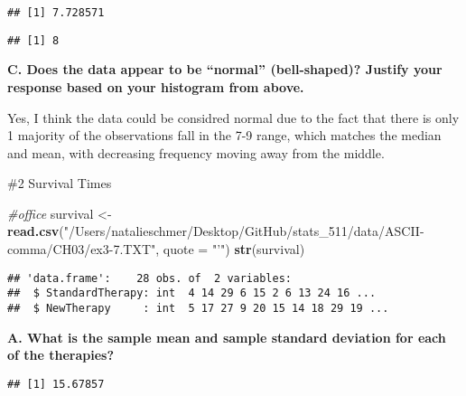 \documentclass[]{article}
\newenvironment{Shaded}{\begin{snugshade}}{\end{snugshade}}
\newcommand{\CommentTok}[1]{\textcolor[rgb]{0.56,0.35,0.01}{\textit{#1}}}
\newcommand{\DataTypeTok}[1]{\textcolor[rgb]{0.13,0.29,0.53}{#1}}
\newcommand{\KeywordTok}[1]{\textcolor[rgb]{0.13,0.29,0.53}{\textbf{#1}}}
\newcommand{\NormalTok}[1]{#1}
\newcommand{\OperatorTok}[1]{\textcolor[rgb]{0.81,0.36,0.00}{\textbf{#1}}}
\newcommand{\StringTok}[1]{\textcolor[rgb]{0.31,0.60,0.02}{#1}}
\begin{document}
\begin{verbatim}
## [1] 7.728571
\end{verbatim}

\begin{Shaded}
\end{Shaded}

\begin{verbatim}
## [1] 8
\end{verbatim}

\textbf{C. Does the data appear to be ``normal'' (bell-shaped)? Justify
your response based on your histogram from above.}

Yes, I think the data could be considred normal due to the fact that
there is only 1 majority of the observations fall in the 7-9 range,
which matches the median and mean, with decreasing frequency moving away
from the middle.

\#2 Survival Times

\begin{Shaded}
\begin{Highlighting}[]
\CommentTok{#office}
\NormalTok{survival <-}\StringTok{ }\KeywordTok{read.csv}\NormalTok{(}\StringTok{"/Users/natalieschmer/Desktop/GitHub/stats_511/data/ASCII-comma/CH03/ex3-7.TXT"}\NormalTok{, }\DataTypeTok{quote =} \StringTok{"'"}\NormalTok{)}
\KeywordTok{str}\NormalTok{(survival)}
\end{Highlighting}
\end{Shaded}

\begin{verbatim}
## 'data.frame':    28 obs. of  2 variables:
##  $ StandardTherapy: int  4 14 29 6 15 2 6 13 24 16 ...
##  $ NewTherapy     : int  5 17 27 9 20 15 14 18 29 19 ...
\end{verbatim}

\textbf{A. What is the sample mean and sample standard deviation for
each of the therapies?}

\begin{Shaded}
\end{Shaded}

\begin{verbatim}
## [1] 15.67857
\end{verbatim}
\end{document}
